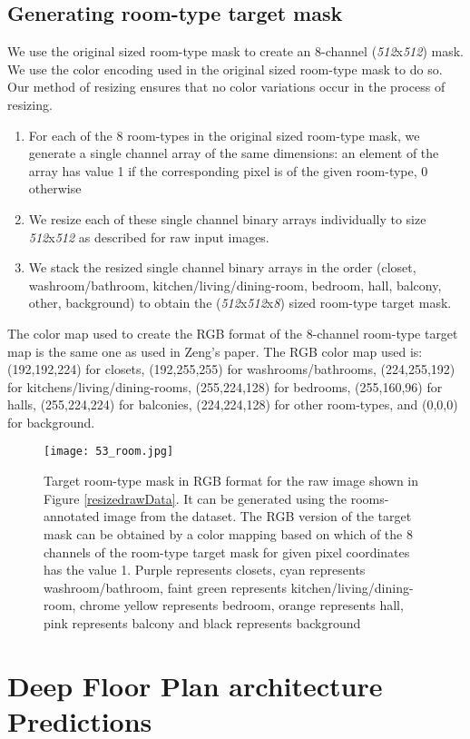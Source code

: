 \documentclass[a4paper]{article}
\begin{document}
\subsection{Generating room-type target mask}
We use the original sized room-type mask to create an 8-channel (\textit{512}x\textit{512}) mask. We use the color encoding used in the original sized room-type mask to do so. Our method of resizing ensures that no color variations occur in the process of resizing.
\begin{enumerate}
    \item For each of the 8 room-types in the original sized room-type mask, we generate a single channel array of the same dimensions: an element of the array has value 1 if the corresponding pixel is of the given room-type, 0 otherwise
    \item We resize each of these single channel binary arrays individually to size {\textit{512}x\textit{512}} as described for raw input images.
    \item We stack the resized single channel binary arrays in the order (closet, washroom/bathroom, kitchen/living/dining-room, bedroom, hall, balcony, other, background) to obtain the (\textit{512}x\textit{512}x\textit{8}) sized room-type target mask.
\end{enumerate}
The color map used to create the RGB format of the 8-channel room-type target map is the same one as used in Zeng's paper. The RGB color map used is: (192,192,224) for closets, (192,255,255) for washrooms/bathrooms, (224,255,192) for kitchens/living/dining-rooms, (255,224,128) for bedrooms, (255,160,96) for halls, (255,224,224) for balconies, (224,224,128) for other room-types, and (0,0,0) for background.
\begin{figure}[H]
    \centering
    \texttt{[image: 53\_room.jpg]}
    \caption{Target room-type mask in RGB format for the raw image shown in Figure \ref{resizedrawData}. It can be generated using the rooms-annotated image from the dataset. The RGB version of the target mask can be obtained by a color mapping based on which of the 8 channels of the room-type target mask for given pixel coordinates has the value 1. Purple represents closets, cyan represents washroom/bathroom, faint green represents kitchen/living/dining-room, chrome yellow represents bedroom, orange represents hall, pink represents balcony and black represents background}
    \label{roomMask}
\end{figure}


\section{Deep Floor Plan architecture Predictions}
\end{document}
